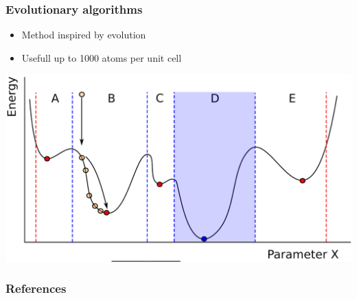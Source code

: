 \documentclass{beamer}
\begin{document}
\begin{frame}
  \frametitle{Evolutionary algorithms}
  \begin{minipage}[t]{0.5\textwidth}
    \begin{itemize}
      \item Method inspired by evolution
      \item Usefull up to 1000 atoms per unit cell
    \end{itemize}
  \end{minipage}%
  \begin{minipage}[t]{0.5\textwidth}
    \includegraphics[width=\textwidth]{figs/Priame.png}
  \end{minipage}
\end{frame}

\begin{frame}
  \frametitle{References}
  \printbibliography
\end{frame}
\end{document}
